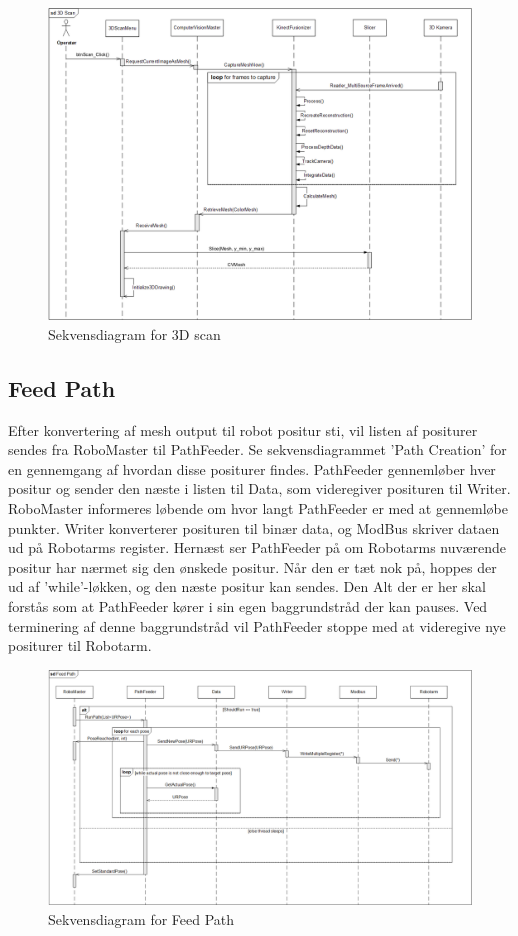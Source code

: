 {\begin{figure}[H]
    \centering
    \includegraphics[width=1\textwidth]{figurer/d/Design/Sequence/sd_3Dscan}
    \caption{Sekvensdiagram for 3D scan}
    \label{sd_3Dscan}
\end{figure}
\newpage

\subsection{Feed Path}
Efter konvertering af mesh output til robot positur sti, vil listen af positurer sendes fra RoboMaster til PathFeeder. 
Se sekvensdiagrammet 'Path Creation' for en gennemgang af hvordan disse positurer findes.
PathFeeder gennemløber hver positur og sender den næste i listen til Data, som videregiver posituren til Writer.
RoboMaster informeres løbende om hvor langt PathFeeder er med at gennemløbe punkter.
Writer konverterer posituren til binær data, og ModBus skriver dataen ud på Robotarms register.
Hernæst ser PathFeeder på om Robotarms nuværende positur har nærmet sig den ønskede positur. 
Når den er tæt nok på, hoppes der ud af 'while'-løkken, og den næste positur kan sendes.
Den Alt der er her skal forstås som at PathFeeder kører i sin egen baggrundstråd der kan pauses. 
Ved terminering af denne baggrundstråd vil PathFeeder stoppe med at videregive nye positurer til Robotarm.

\begin{figure}[H]
    \centering
    \includegraphics[width=1\textwidth] {figurer/d/Design/Sequence/sd_feedpath}
    \caption{Sekvensdiagram for Feed Path}
    \label{sd_feedpath}
\end{figure}

}
